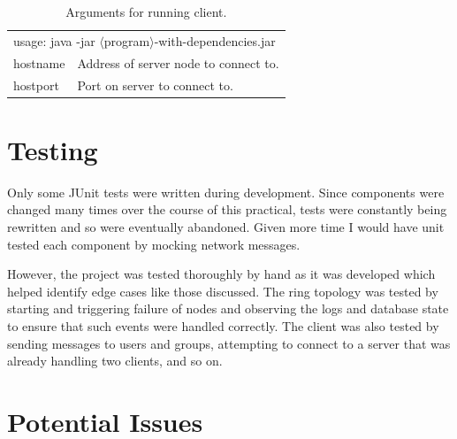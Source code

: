 \documentclass[12pt]{article}
\begin{document}
\renewcommand{\arraystretch}{1.5}
\begin{table}[!ht]
\begin{tabular}{ll}
\multicolumn{2}{l}{usage: java -jar $\langle$program$\rangle$-with-dependencies.jar}
\\ 

 hostname           &  Address of server node to connect to. \\
 hostport	    &  Port on server to connect to.  \\
\end{tabular}
\caption{Arguments for running client.}
\label{tbl:clientargs}
\end{table}

\section{Testing}

Only some JUnit tests were written during development. Since components were changed many times over the course of this practical, tests were constantly being rewritten and so were eventually abandoned. Given more time I would have unit tested each component by mocking network messages.

However, the project was tested thoroughly by hand as it was developed which helped identify edge cases like those discussed. The ring topology was tested by starting and triggering failure of nodes and observing the logs and database state to ensure that such events were handled correctly. The client was also tested by sending messages to users and groups, attempting to connect to a server that was already handling two clients, and so on.

\section{Potential Issues}
\end{document}
